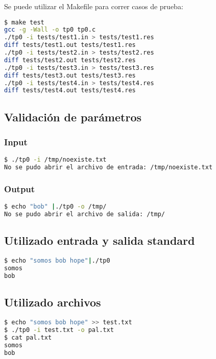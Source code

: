 \documentclass[10pt,a4paper]{article}
\begin{document}
Se puede utilizar el Makefile para correr casos de prueba:

\begin{lstlisting}[language=bash]
$ make test
gcc -g -Wall -o tp0 tp0.c 
./tp0 -i tests/test1.in > tests/test1.res
diff tests/test1.out tests/test1.res
./tp0 -i tests/test2.in > tests/test2.res
diff tests/test2.out tests/test2.res
./tp0 -i tests/test3.in > tests/test3.res
diff tests/test3.out tests/test3.res
./tp0 -i tests/test4.in > tests/test4.res
diff tests/test4.out tests/test4.res
\end{lstlisting}

\subsection{Validación de parámetros}

\subsubsection{Input}

\begin{lstlisting}[language=bash]
$ ./tp0 -i /tmp/noexiste.txt
No se pudo abrir el archivo de entrada: /tmp/noexiste.txt
\end{lstlisting}

\subsubsection{Output}

\begin{lstlisting}[language=bash]
$ echo "bob" |./tp0 -o /tmp/
No se pudo abrir el archivo de salida: /tmp/
\end{lstlisting}

\subsection{Utilizado entrada y salida standard}

\begin{lstlisting}[language=bash]
$ echo "somos bob hope"|./tp0 
somos
bob
\end{lstlisting}

\subsection{Utilizado archivos}

\begin{lstlisting}[language=bash]
$ echo "somos bob hope" >> test.txt
$ ./tp0 -i test.txt -o pal.txt
$ cat pal.txt 
somos
bob
\end{lstlisting}
\end{document}
